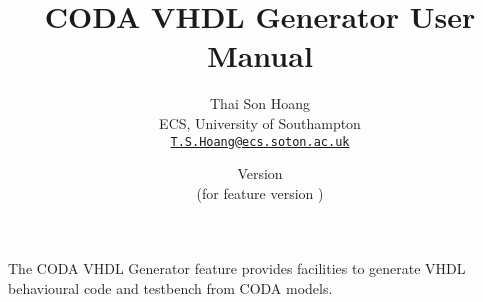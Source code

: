\documentclass[a4paper,10pt]{article}
\title{CODA VHDL Generator User Manual}
\author{%
  Thai Son Hoang\\%
  ECS, University of Southampton\\%
  \texttt{\href{mailto:T.S.Hoang@ecs.soton.ac.uk}{T.S.Hoang@ecs.soton.ac.uk}}%
}%
\date{%
  Version \VHDLManualVersion\\%
  (for feature version \VHDLFeatureVersion)\\
  \ifplastex
  \VHDLManualDate
  \else
  \displaydate{VHDLManualDate}%
  \fi
}
\begin{document}
\ifplastex%
\maketitle%
\else%
 \ifstandalone%
 \maketitle %
 \else%
 \fi%
\fi%

The CODA VHDL Generator feature provides facilities to generate VHDL behavioural code and testbench from CODA models. 












\end{document}

